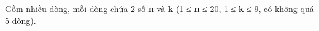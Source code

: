 Gồm nhiều dòng, mỗi dòng chứa 2 số   \textbf{n}   và   \textbf{k}   (1 ≤   \textbf{n}   ≤ 20, 1 ≤   \textbf{k}   ≤ 9, có không quá 5 dòng).
